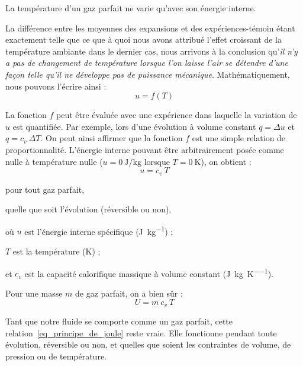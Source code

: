 		\begin{trucimportant}
			La température d’un gaz parfait ne varie qu’avec son énergie interne.
		\end{trucimportant}


La différence entre les moyennes des expansions et des expériences-témoin étant exactement telle que ce que à quoi nous avons attribué l’effet croissant de la température ambiante dans le dernier cas, nous arrivons à la conclusion qu’\emph{il n’y a pas de changement de température lorsque l’on laisse l’air se détendre d’une façon telle qu’il ne développe pas de puissance mécanique}.
		Mathématiquement, nous pouvons l’écrire ainsi :
		\begin{equation}
			u = f(T)
		\end{equation}

		La fonction $f$ peut être évaluée avec une expérience dans laquelle la variation de~$u$ est quantifiée. Par exemple, lors d’une évolution à volume constant $q = \Delta u$ et $q = c_v \ \Delta T$. On peut ainsi affirmer que la fonction $f$ est une simple relation de proportionnalité. L’énergie interne pouvant être arbitrairement posée comme nulle à température nulle ($u = \SI{0}{\joule\per\kilogram}$ lorsque $T = \SI{0}{\kelvin}$), on obtient :
		\begin{equation}
			u = c_v \ T
			\label{eq_principe_de_joule}
		\end{equation}
		\begin{equationterms}
			\item pour tout gaz parfait,
			\item quelle que soit l’évolution (réversible ou non),
			\item où \tab $u$ 	\tab est l’énergie interne spécifique (\si{\joule\per\kilogram}) ;
			\item 	\tab $T$ 	\tab est la température (\si{\kelvin}) ;
			\item et \tab $c_v$ 	\tab est la capacité calorifique massique à volume constant (\si{\joule\per\kilogram\per\kelvin}).
		\end{equationterms}

		Pour une masse $m$ de gaz parfait, on a bien sûr :
		\begin{equation}
			U = m \ c_v \ T
			\label{eq_principe_de_joule_m}
		\end{equation}

		Tant que notre fluide se comporte comme un gaz parfait, cette relation~\ref{eq_principe_de_joule} reste vraie. Elle fonctionne pendant toute évolution, réversible ou non, et quelles que soient les contraintes de volume, de pression ou de température.

